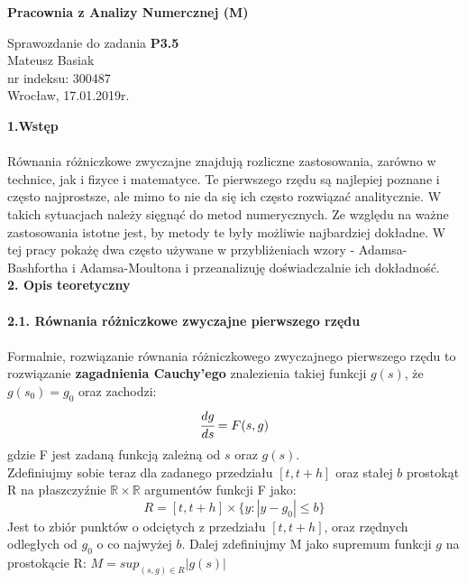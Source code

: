 \documentclass[a4paper]{article}
\begin{document}
\begin{center}
\LARGE
\textbf{Pracownia z Analizy Numercznej (M)}\\
\end{center}
\begin{center}
\Large
Sprawozdanie do zadania \textbf{P3.5}\\
Mateusz Basiak\\
nr indeksu: 300487\\
Wrocław, 17.01.2019r.\\
\end{center}
\Large
\textbf{1.Wstęp}\\\\
\normalsize
Równania różniczkowe zwyczajne znajdują rozliczne zastosowania, zarówno w technice, jak i fizyce i matematyce. Te pierwszego rzędu są najlepiej poznane i często najprostsze, ale mimo to nie da się ich często rozwiązać analitycznie. W takich sytuacjach należy sięgnąć do metod numerycznych. Ze względu na ważne zastosowania istotne jest, by metody te były możliwie najbardziej dokładne. W tej pracy pokażę dwa często używane w przybliżeniach wzory -  Adamsa-Bashfortha i Adamsa-Moultona i przeanalizuję doświadczalnie ich dokładność.\\


\Large
\textbf{2. Opis teoretyczny}\\\\
\large
\textbf{2.1. Równania różniczkowe zwyczajne pierwszego rzędu}\\\\
\normalsize
Formalnie, rozwiązanie równania różniczkowego zwyczajnego pierwszego rzędu to rozwiązanie \textbf{zagadnienia Cauchy'ego} \cite{UW} znalezienia takiej funkcji $g(s)$, że $g(s_0) = g_0$ oraz zachodzi:
\begin{equation}\label{Cauchy}
\cfrac{dg}{ds} = F(s, g)
\end{equation}
gdzie F jest zadaną funkcją zależną od $s$ oraz $g(s)$.\\

Zdefiniujmy sobie teraz dla zadanego przedziału $[t, t+h]$ oraz stałej $b$ prostokąt R na płaszczyźnie $\mathbb{R} \times \mathbb{R}$ argumentów funkcji F jako:
\begin{equation}
R = [t, t+h] \times \{ y : |y - g_0| \leq b \} 
\end{equation}
Jest to zbiór punktów o odciętych z przedziału $[t, t+h]$, oraz rzędnych odległych od $g_0$ o co najwyżej $b$. Dalej zdefiniujmy M jako supremum funkcji $g$ na prostokącie R:  $M = sup_{(s,g) \in R} |g(s)|$\\
\end{document}
